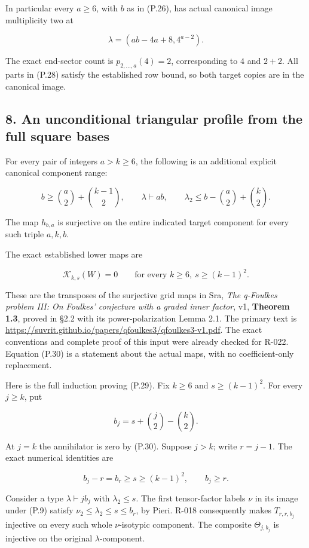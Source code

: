 \documentclass[
  10pt,
]{article}
\begin{document}
In particular every \(a\ge6\), with \(b\) as in (P.26), has actual
canonical image multiplicity two at

\[
\lambda=(ab-4a+8,4^{a-2}).
\tag{P.28}
\]

The exact end-sector count is \(p_{2,\ldots,a}(4)=2\), corresponding to
\(4\) and \(2+2\). All parts in (P.28) satisfy the established row
bound, so both target copies are in the canonical image.

\subsection{8. An unconditional triangular profile from the full square
bases}\label{an-unconditional-triangular-profile-from-the-full-square-bases}

For every pair of integers \(a>k\ge6\), the following is an additional
explicit canonical component range:

\[
\boxed{
b\ge\binom a2+\binom{k-1}{2},\qquad
\lambda\vdash ab,\qquad
\lambda_2\le b-\binom a2+\binom k2.}
\tag{P.29}
\]

The map \(h_{b,a}\) is surjective on the entire indicated target
component for every such triple \(a,k,b\).

The exact established lower maps are

\[
\mathcal K_{k,s}(W)=0\qquad
\text{for every }k\ge6,\ s\ge(k-1)^2.
\tag{P.30}
\]

These are the transposes of the surjective grid maps in Sra, \emph{The
q-Foulkes problem III: On Foulkes' conjecture with a graded inner
factor}, v1, \textbf{Theorem 1.3}, proved in §2.2 with its
power-polarization Lemma 2.1. The primary text is
\url{https://suvrit.github.io/papers/qfoulkes3/qfoulkes3-v1.pdf}. The
exact conventions and complete proof of this input were already checked
for R-022. Equation (P.30) is a statement about the actual maps, with no
coefficient-only replacement.

Here is the full induction proving (P.29). Fix \(k\ge6\) and
\(s\ge(k-1)^2\). For every \(j\ge k\), put

\[
b_j=s+\binom j2-\binom k2.
\tag{P.31}
\]

At \(j=k\) the annihilator is zero by (P.30). Suppose \(j>k\); write
\(r=j-1\). The exact numerical identities are

\[
b_j-r=b_r\ge s\ge(k-1)^2,\qquad b_j\ge r.
\tag{P.32}
\]

Consider a type \(\lambda\vdash j b_j\) with \(\lambda_2\le s\). The
first tensor-factor labels \(\nu\) in its image under (P.9) satisfy
\(\nu_2\le\lambda_2\le s\le b_r\), by Pieri. R-018 consequently makes
\(T_{r,r,b_j}\) injective on every such whole \(\nu\)-isotypic
component. The composite \(\Theta_{j,b_j}\) is injective on the original
\(\lambda\)-component.
\end{document}
